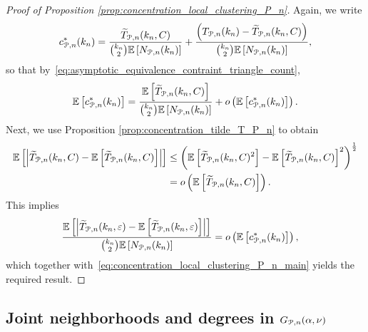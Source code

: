 \begin{proof}[Proof of Proposition \ref{prop:concentration_local_clustering_P_n}]
Again, we write
\begin{align*}
	c_{{\mathcal P}, n}^\ast(k_n) = \frac{\widetilde{T}_{{\mathcal P},n}(k_n,C)}{\binom{k_n}{2}\mathbb{E}\left[N_{{\mathcal P},n}(k_n)\right]}
	+ \frac{\left(T_{{\mathcal P},n}(k_n)-\widetilde{T}_{{\mathcal P},n}(k_n,C)\right)}{\binom{k_n}{2}\mathbb{E}\left[N_{{\mathcal P},n}(k_n)\right]},
\end{align*}
so that by~\eqref{eq:asymptotic_equivalence_contraint_triangle_count},
\begin{equation}\label{eq:concentration_local_clustering_P_n_main}
	\mathbb{E}\left[c_{{\mathcal P},n}^\ast(k_n)\right] = \frac{\mathbb{E}\left[\widetilde{T}_{{\mathcal P},n}(k_n,C)\right]}{\binom{k_n}{2}\mathbb{E}\left[N_{{\mathcal P},n}(k_n)\right]}
	+ o\left(\mathbb{E}\left[c_{{\mathcal P},n}^\ast(k_n)\right]\right).
\end{equation}
Next, we use Proposition \ref{prop:concentration_tilde_T_P_n} to obtain
\begin{align*}
	\mathbb{E}\left[\left|\widetilde{T}_{{\mathcal P},n}(k_n,C) - \mathbb{E}\left[\widetilde{T}_{{\mathcal P},n}(k_n,C)\right]\right|\right]
	&\le \left(\mathbb{E}\left[\widetilde{T}_{{\mathcal P},n}(k_n,C)^2\right] 
		- \mathbb{E}\left[\widetilde{T}_{{\mathcal P},n}(k_n,C)\right]^2\right)^{\frac{1}{2}}\\
	&= o\left(\mathbb{E}\left[\widetilde{T}_{{\mathcal P},n}(k_n,C)\right]\right).
\end{align*}
This implies
\begin{align*}
	\frac{\mathbb{E}\left[\left|\widetilde{T}_{{\mathcal P},n}(k_n,\varepsilon) - \mathbb{E}\left[\widetilde{T}_{{\mathcal P},n}(k_n,\varepsilon)\right]\right|\right]}
		{\binom{k_n}{2}\mathbb{E}\left[N_{{\mathcal P},n}(k_n)\right]}
	&= o\left(\mathbb{E}\left[c_{{\mathcal P},n}^\ast(k_n)\right]\right),
\end{align*}
which together with~\eqref{eq:concentration_local_clustering_P_n_main} yields the required result.
\end{proof}

\subsection{Joint neighborhoods and degrees in $G_{{\mathcal P},n}(\alpha,\nu)$}

